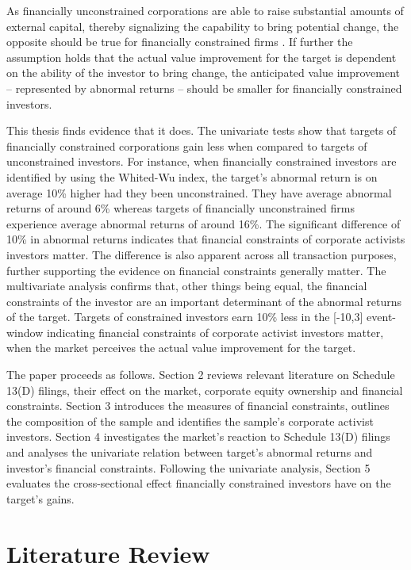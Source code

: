 \documentclass[12pt]{article}
\begin{document}
As financially unconstrained corporations are able to raise substantial amounts of external capital, thereby signalizing the capability to bring potential change, the opposite should be true for financially constrained firms \citep[p.1]{Farre-mensa2013}. If further the assumption holds that the actual value improvement for the target is dependent on the ability of the investor to bring change, the anticipated value improvement -- represented by abnormal returns -- should be smaller for financially constrained investors.\par 
This thesis finds evidence that it does. The univariate tests show that targets of financially constrained corporations gain less when compared to targets of unconstrained investors. For instance, when financially constrained investors are identified by using the Whited-Wu index, the target's abnormal return is on average 10\% higher had they been unconstrained. They have average abnormal returns of around 6\% whereas targets of financially unconstrained firms experience average abnormal returns of around 16\%. The significant difference of 10\% in abnormal returns indicates that financial constraints of corporate activists investors matter. The difference is also apparent across all transaction purposes, further supporting the evidence on financial constraints generally matter. The multivariate analysis confirms that, other things being equal, the financial constraints of the investor are an important determinant of the abnormal returns of the target. Targets of constrained investors earn 10\% less in the [-10,3] event-window indicating financial constraints of corporate activist investors matter, when the market perceives the actual value improvement for the target. 

The paper proceeds as follows. Section 2 reviews relevant literature on Schedule 13(D) filings, their effect on the market, corporate equity ownership and financial constraints. Section 3 introduces the measures of financial constraints, outlines the composition of the sample and identifies the sample's corporate activist investors. Section 4 investigates the market's reaction to Schedule 13(D) filings and analyses the univariate relation between target's abnormal returns and investor's financial constraints. Following the univariate analysis, Section 5 evaluates the cross-sectional effect financially constrained investors have on the target's gains.

\section{Literature Review}
\end{document}
